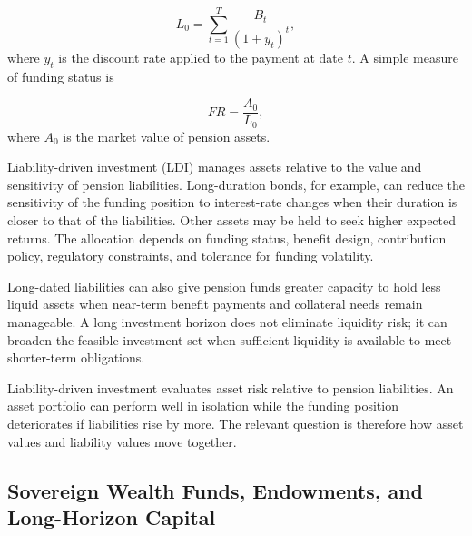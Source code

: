 \begin{equation}
L_0=\sum_{t=1}^{T}\frac{B_t}{(1+y_t)^t},
\label{eq:ch14-pension-liability-pv}
\end{equation}
where $y_t$ is the discount rate applied to the payment at date $t$. A simple measure of funding status is

\begin{equation}
FR=\frac{A_0}{L_0},
\label{eq:ch14-pension-funding-ratio}
\end{equation}
where $A_0$ is the market value of pension assets.

Liability-driven investment (LDI) manages assets relative to the value and sensitivity of pension liabilities. Long-duration bonds, for example, can reduce the sensitivity of the funding position to interest-rate changes when their duration is closer to that of the liabilities. Other assets may be held to seek higher expected returns. The allocation depends on funding status, benefit design, contribution policy, regulatory constraints, and tolerance for funding volatility.

Long-dated liabilities can also give pension funds greater capacity to hold less liquid assets when near-term benefit payments and collateral needs remain manageable. A long investment horizon does not eliminate liquidity risk; it can broaden the feasible investment set when sufficient liquidity is available to meet shorter-term obligations.

\begin{tcolorbox}[
  enhanced,
  breakable,
  colback=white,
  colframe=FinanceBlue,
  boxrule=0.7pt,
  sharp corners,
  borderline west={2.2pt}{0pt}{FinanceBlue},
  title=\textbf{Financial Perspective: LDI Focuses on the Funding Position, Not Assets Alone},
  coltitle=white,
  colbacktitle=FinanceBlue,
  fonttitle=\bfseries,
  before skip=1.2em,
  after skip=1.2em
]

Liability-driven investment evaluates asset risk relative to pension liabilities. An asset portfolio can perform well in isolation while the funding position deteriorates if liabilities rise by more. The relevant question is therefore how asset values and liability values move together.

\end{tcolorbox}

\subsection{Sovereign Wealth Funds, Endowments, and Long-Horizon Capital}

